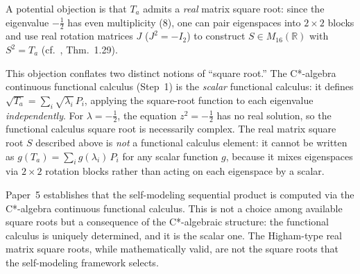 \begin{remark}
\label{rem:scalar-vs-matrix-sqrt}
A potential objection is that $T_a$ admits a \emph{real} matrix
square root: since the eigenvalue $-\tfrac{1}{2}$ has even
multiplicity ($8$), one can pair eigenspaces into $2\times 2$ blocks
and use real rotation matrices $J$ ($J^2 = -I_2$) to construct
$S\in M_{16}(\mathbb{R})$ with $S^2 = T_a$
(cf.~\cite{Higham2008}, Thm.~1.29).

This objection conflates two distinct notions of ``square root.''
The C*-algebra continuous functional calculus (Step~1) is the
\emph{scalar} functional calculus: it defines
$\sqrt{T_a} = \sum_i \sqrt{\lambda_i}\,P_i$, applying the
square-root function to each eigenvalue \emph{independently}.
For $\lambda = -\tfrac{1}{2}$, the equation $z^2 = -\tfrac{1}{2}$
has no real solution, so the functional calculus square root is
necessarily complex.  The real matrix square root $S$ described
above is \emph{not} a functional calculus element: it cannot be
written as $g(T_a) = \sum_i g(\lambda_i)\,P_i$ for any scalar
function $g$, because it mixes eigenspaces via $2\times 2$
rotation blocks rather than acting on each eigenspace by a scalar.

Paper~5 establishes that the self-modeling sequential product is
computed via the C*-algebra continuous functional calculus.  This is
not a choice among available square roots but a consequence of the
C*-algebraic structure: the functional calculus is uniquely
determined, and it is the scalar one.  The Higham-type real matrix
square roots, while mathematically valid, are not the square roots
that the self-modeling framework selects.
\end{remark}

